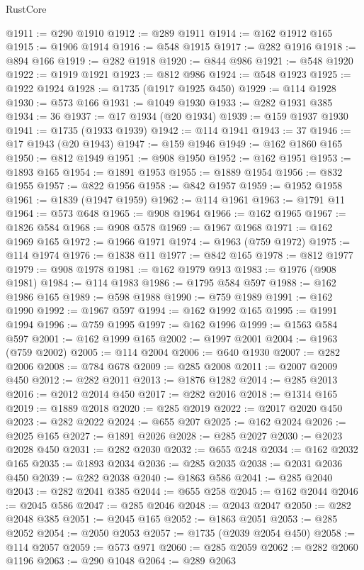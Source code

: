 \begin{lexlean}{RustCore}
\begin{coremodule}
@1911 := @290 @1910
@1912 := @289 @1911
@1914 := @162 @1912 @165
@1915 := @1906 @1914
@1916 := @548 @1915
@1917 := @282 @1916
@1918 := @894 @166
@1919 := @282 @1918
@1920 := @844 @986
@1921 := @548 @1920
@1922 := @1919 @1921
@1923 := @812 @986
@1924 := @548 @1923
@1925 := @1922 @1924
@1928 := @1735 (@1917 @1925 @450)
@1929 := @114 @1928
@1930 := @573 @166
@1931 := @1049 @1930
@1933 := @282 @1931 @385
@1934 := 36
@1937 := @17 @1934 (@20 @1934)
@1939 := @159 @1937 @1930
@1941 := @1735 (@1933 @1939)
@1942 := @114 @1941
@1943 := 37
@1946 := @17 @1943 (@20 @1943)
@1947 := @159 @1946
@1949 := @162 @1860 @165
@1950 := @812 @1949
@1951 := @908 @1950
@1952 := @162 @1951
@1953 := @1893 @165
@1954 := @1891 @1953
@1955 := @1889 @1954
@1956 := @832 @1955
@1957 := @822 @1956
@1958 := @842 @1957
@1959 := @1952 @1958
@1961 := @1839 (@1947 @1959)
@1962 := @114 @1961
@1963 := @1791 @11
@1964 := @573 @648
@1965 := @908 @1964
@1966 := @162 @1965
@1967 := @1826 @584
@1968 := @908 @578
@1969 := @1967 @1968
@1971 := @162 @1969 @165
@1972 := @1966 @1971
@1974 := @1963 (@759 @1972)
@1975 := @114 @1974
@1976 := @1838 @11
@1977 := @842 @165
@1978 := @812 @1977
@1979 := @908 @1978
@1981 := @162 @1979 @913
@1983 := @1976 (@908 @1981)
@1984 := @114 @1983
@1986 := @1795 @584 @597
@1988 := @162 @1986 @165
@1989 := @598 @1988
@1990 := @759 @1989
@1991 := @162 @1990
@1992 := @1967 @597
@1994 := @162 @1992 @165
@1995 := @1991 @1994
@1996 := @759 @1995
@1997 := @162 @1996
@1999 := @1563 @584 @597
@2001 := @162 @1999 @165
@2002 := @1997 @2001
@2004 := @1963 (@759 @2002)
@2005 := @114 @2004
@2006 := @640 @1930
@2007 := @282 @2006
@2008 := @784 @678
@2009 := @285 @2008
@2011 := @2007 @2009 @450
@2012 := @282 @2011
@2013 := @1876 @1282
@2014 := @285 @2013
@2016 := @2012 @2014 @450
@2017 := @282 @2016
@2018 := @1314 @165
@2019 := @1889 @2018
@2020 := @285 @2019
@2022 := @2017 @2020 @450
@2023 := @282 @2022
@2024 := @655 @207
@2025 := @162 @2024
@2026 := @2025 @165
@2027 := @1891 @2026
@2028 := @285 @2027
@2030 := @2023 @2028 @450
@2031 := @282 @2030
@2032 := @655 @248
@2034 := @162 @2032 @165
@2035 := @1893 @2034
@2036 := @285 @2035
@2038 := @2031 @2036 @450
@2039 := @282 @2038
@2040 := @1863 @586
@2041 := @285 @2040
@2043 := @282 @2041 @385
@2044 := @655 @258
@2045 := @162 @2044
@2046 := @2045 @586
@2047 := @285 @2046
@2048 := @2043 @2047
@2050 := @282 @2048 @385
@2051 := @2045 @165
@2052 := @1863 @2051
@2053 := @285 @2052
@2054 := @2050 @2053
@2057 := @1735 (@2039 @2054 @450)
@2058 := @114 @2057
@2059 := @573 @971
@2060 := @285 @2059
@2062 := @282 @2060 @1196
@2063 := @290 @1048
@2064 := @289 @2063

\end{coremodule}
\end{lexlean}
